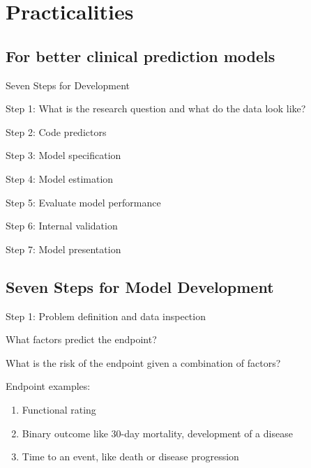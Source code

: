 \documentclass[
  12pt,
  ignorenonframetext,
]{beamer}
\providecommand{\tightlist}{%
  \setlength{\itemsep}{0pt}\setlength{\parskip}{0pt}}
\begin{document}
\hypertarget{practicalities}{%
\section{Practicalities}\label{practicalities}}

\hypertarget{for-better-clinical-prediction-models}{%
\subsection{For better clinical prediction
models}\label{for-better-clinical-prediction-models}}

\begin{frame}{Seven Steps for Development}
\protect\hypertarget{seven-steps-for-development}{}

Step 1: What is the research question and what do the data look like?

Step 2: Code predictors

Step 3: Model specification

Step 4: Model estimation

Step 5: Evaluate model performance

Step 6: Internal validation

Step 7: Model presentation

\end{frame}

\hypertarget{seven-steps-for-model-development}{%
\subsection{Seven Steps for Model
Development}\label{seven-steps-for-model-development}}

\begin{frame}{Step 1: Problem definition and data inspection}
\protect\hypertarget{step-1-problem-definition-and-data-inspection}{}

What factors predict the endpoint?

What is the risk of the endpoint given a combination of factors?

Endpoint examples:

\begin{enumerate}[<+->]
\tightlist
\item
  Functional rating
\item
  Binary outcome like 30-day mortality, development of a disease
\item
  Time to an event, like death or disease progression
\end{enumerate}

\end{frame}
\end{document}
